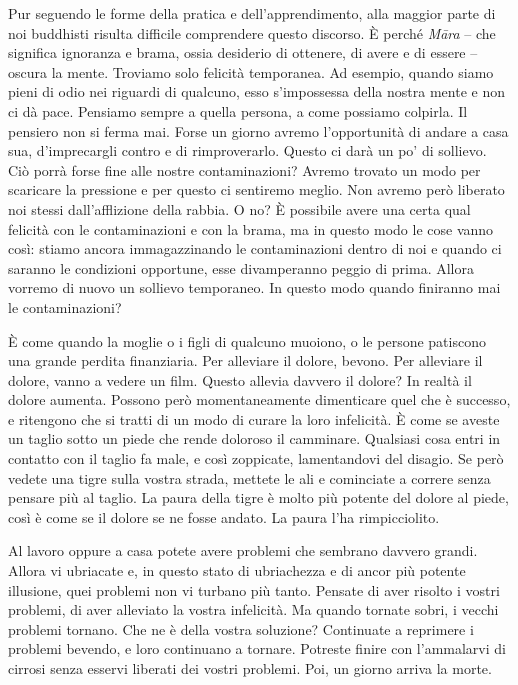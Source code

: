 Pur seguendo le forme della pratica e dell'apprendimento, alla maggior
parte di noi buddhisti risulta difficile comprendere questo discorso. È
perché \emph{Māra} -- che significa ignoranza e brama, ossia desiderio
di ottenere, di avere e di essere -- oscura la mente. Troviamo solo
felicità temporanea. Ad esempio, quando siamo pieni di odio nei riguardi
di qualcuno, esso s'impossessa della nostra mente e non ci dà pace.
Pensiamo sempre a quella persona, a come possiamo colpirla. Il pensiero
non si ferma mai. Forse un giorno avremo l'opportunità di andare a casa
sua, d'imprecargli contro e di rimproverarlo. Questo ci darà un po' di
sollievo. Ciò porrà forse fine alle nostre contaminazioni? Avremo
trovato un modo per scaricare la pressione e per questo ci sentiremo
meglio. Non avremo però liberato noi stessi dall'afflizione della
rabbia. O no? È possibile avere una certa qual felicità con le
contaminazioni e con la brama, ma in questo modo le cose vanno così:
stiamo ancora immagazzinando le contaminazioni dentro di noi e quando ci
saranno le condizioni opportune, esse divamperanno peggio di prima.
Allora vorremo di nuovo un sollievo temporaneo. In questo modo quando
finiranno mai le contaminazioni?

È come quando la moglie o i figli di qualcuno muoiono, o le persone
patiscono una grande perdita finanziaria. Per alleviare il dolore,
bevono. Per alleviare il dolore, vanno a vedere un film. Questo allevia
davvero il dolore? In realtà il dolore aumenta. Possono però
momentaneamente dimenticare quel che è successo, e ritengono che si
tratti di un modo di curare la loro infelicità. È come se aveste un
taglio sotto un piede che rende doloroso il camminare. Qualsiasi cosa
entri in contatto con il taglio fa male, e così zoppicate, lamentandovi
del disagio. Se però vedete una tigre sulla vostra strada, mettete le
ali e cominciate a correre senza pensare più al taglio. La paura della
tigre è molto più potente del dolore al piede, così è come se il dolore
se ne fosse andato. La paura l'ha rimpicciolito.

Al lavoro oppure a casa potete avere problemi che sembrano davvero
grandi. Allora vi ubriacate e, in questo stato di ubriachezza e di ancor
più potente illusione, quei problemi non vi turbano più tanto. Pensate
di aver risolto i vostri problemi, di aver alleviato la vostra
infelicità. Ma quando tornate sobri, i vecchi problemi tornano. Che ne è
della vostra soluzione? Continuate a reprimere i problemi bevendo, e
loro continuano a tornare. Potreste finire con l'ammalarvi di cirrosi
senza esservi liberati dei vostri problemi. Poi, un giorno arriva la
morte.

